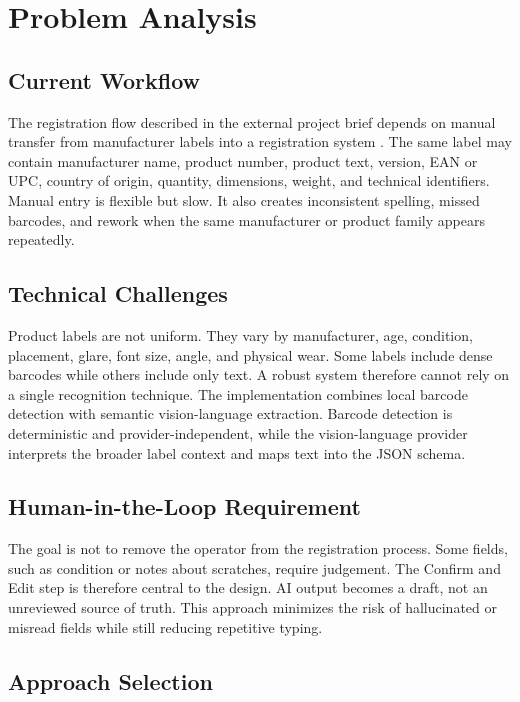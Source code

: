 \chapter{Problem Analysis}
\label{chap:analysis}

\section{Current Workflow}

The registration flow described in the external project brief depends on manual transfer from manufacturer labels into a registration system \cite{buy2sell-brief}. The same label may contain manufacturer name, product number, product text, version, EAN or UPC, country of origin, quantity, dimensions, weight, and technical identifiers. Manual entry is flexible but slow. It also creates inconsistent spelling, missed barcodes, and rework when the same manufacturer or product family appears repeatedly.

\section{Technical Challenges}

Product labels are not uniform. They vary by manufacturer, age, condition, placement, glare, font size, angle, and physical wear. Some labels include dense barcodes while others include only text. A robust system therefore cannot rely on a single recognition technique. The implementation combines local barcode detection with semantic vision-language extraction. Barcode detection is deterministic and provider-independent, while the vision-language provider interprets the broader label context and maps text into the JSON schema.

\section{Human-in-the-Loop Requirement}

The goal is not to remove the operator from the registration process. Some fields, such as condition or notes about scratches, require judgement. The Confirm and Edit step is therefore central to the design. AI output becomes a draft, not an unreviewed source of truth. This approach minimizes the risk of hallucinated or misread fields while still reducing repetitive typing.

\section{Approach Selection}

